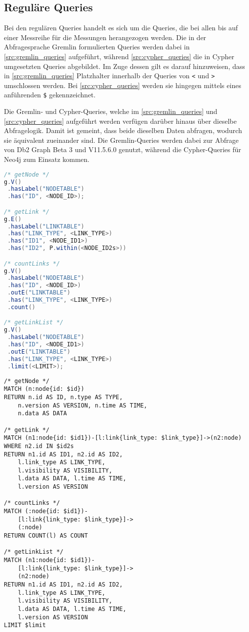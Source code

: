 \subsection{Reguläre Queries}
Bei den regulären Queries handelt es sich um die Queries, die bei allen bis auf einer Messreihe für die Messungen herangezogen werden. Die in der Abfragesprache Gremlin formulierten Queries werden dabei in \autoref{src:gremlin_queries} aufgeführt, während \autoref{src:cypher_queries} die in Cypher umgesetzten Queries abgebildet. Im Zuge dessen gilt es darauf hinzuweisen, dass in \autoref{src:gremlin_queries} Platzhalter innerhalb der Queries von \texttt{<} und \texttt{>} umschlossen werden. Bei \autoref{src:cypher_queries} werden sie hingegen mittels eines anführenden \texttt{\$} gekennzeichnet.

Die Gremlin- und Cypher-Queries, welche im \autoref{src:gremlin_queries} und \autoref{src:cypher_queries} aufgeführt werden verfügen darüber hinaus über dieselbe Abfragelogik. Damit ist gemeint, dass beide dieselben Daten abfragen, wodurch sie äquivalent zueinander sind. Die Gremlin-Queries werden dabei zur Abfrage von Db2 Graph Beta 3 und V11.5.6.0 genutzt, während die Cypher-Queries für Neo4j zum Einsatz kommen. 

\begin{lstlisting}[label=src:gremlin_queries,caption={ Gremlin Queries (regulär)},language=Java]
/* getNode */
g.V()
 .hasLabel("NODETABLE")
 .has("ID", <NODE_ID>);

/* getLink */
g.E()
 .hasLabel("LINKTABLE")
 .has("LINK_TYPE", <LINK_TYPE>)
 .has("ID1", <NODE_ID1>)
 .has("ID2", P.within(<NODE_ID2s>))

/* countLinks */
g.V()
 .hasLabel("NODETABLE")
 .has("ID", <NODE_ID>)
 .outE("LINKTABLE")
 .has("LINK_TYPE", <LINK_TYPE>)
 .count()

/* getLinkList */
g.V()
 .hasLabel("NODETABLE")
 .has("ID", <NODE_ID1>)
 .outE("LINKTABLE")
 .has("LINK_TYPE", <LINK_TYPE>)
 .limit(<LIMIT>);
\end{lstlisting}

\begin{lstlisting}[label=src:cypher_queries,caption={Cypher Queries (regulär)},language=CQL]
/* getNode */
MATCH (n:node{id: $id}) 
RETURN n.id AS ID, n.type AS TYPE, 
    n.version AS VERSION, n.time AS TIME, 
    n.data AS DATA

/* getLink */
MATCH (n1:node{id: $id1})-[l:link{link_type: $link_type}]->(n2:node) 
WHERE n2.id IN $id2s 
RETURN n1.id AS ID1, n2.id AS ID2, 
    l.link_type AS LINK_TYPE, 
    l.visibility AS VISIBILITY, 
    l.data AS DATA, l.time AS TIME, 
    l.version AS VERSION

/* countLinks */
MATCH (:node{id: $id1})-
    [l:link{link_type: $link_type}]->
    (:node) 
RETURN COUNT(l) AS COUNT

/* getLinkList */
MATCH (n1:node{id: $id1})-
    [l:link{link_type: $link_type}]->
    (n2:node) 
RETURN n1.id AS ID1, n2.id AS ID2, 
    l.link_type AS LINK_TYPE, 
    l.visibility AS VISIBILITY, 
    l.data AS DATA, l.time AS TIME, 
    l.version AS VERSION 
LIMIT $limit
\end{lstlisting}

